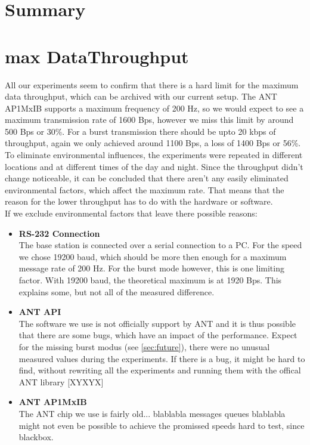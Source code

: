 \section{Summary}

\section{max DataThroughput}
\label{sec:dataThrougput}

All our experiments seem to confirm that there is a hard limit for the maximum data throughput, which can be archived with our current setup. The ANT AP1MxIB supports a maximum frequency of 200 Hz, so we would expect to see a maximum transmission rate of 1600 Bps, however we miss this limit by around 500 Bps or 30\%. For a burst transmission there should be upto 20 kbps of throughput, again we only achieved around 1100 Bps, a loss of 1400 Bps or 56\%.\\
To eliminate environmental influences, the experiments were repeated in different locations and at different times of the day and night. Since the throughput didn't change noticeable, it can be concluded that there aren't any easily eliminated environmental factors, which affect the maximum rate. That means that the reason for the lower throughput has to do with the hardware or software. \\

If we exclude environmental factors that leave there possible reasons:
\begin{itemize}
	\item{\textbf{RS-232 Connection}} \hfill \\ The base station is connected over a serial connection to a PC. For the speed we chose 19200 baud, which should be more then enough for a maximum message rate of 200 Hz. For the burst mode however, this is one limiting factor. With 19200 baud, the theoretical maximum is at 1920 Bps. This explains some, but not all of the measured difference.
	\item{\textbf{ANT API}} \hfill \\ The software we use is not officially support by ANT and it is thus possible that there are some bugs, which have an impact of the performance. Expect for the missing burst modus (see \ref{sec:future}), there were no unusual measured values during the experiments. If there is a bug, it might be hard to find, without rewriting all the experiments and running them with the offical ANT library [XYXYX]
	\item{\textbf{ANT AP1MxIB}} \hfill \\ The ANT chip we use is fairly old... blablabla  messages queues blablabla might not even be possible to achieve the promissed speeds hard to test, since blackbox.
\end{itemize}
\newpage
